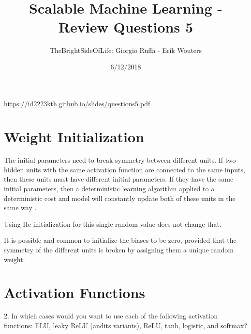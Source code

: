 \documentclass[a4paper]{article}
\title{Scalable Machine Learning - Review Questions 5}
\author{TheBrightSideOfLife: Giorgio Ruffa - Erik Wouters}
\date{6/12/2018}
\begin{document}
\maketitle

\url{https://id2223kth.github.io/slides/questions5.pdf}

\section{Weight Initialization}
The initial parameters need to break symmetry between different units. If two hidden units with the same activation function are connected to the same inputs, then these units must have different initial parameters. If they have the same initial parameters, then a deterministic learning algorithm applied to a deterministic cost and model will constantly update both of these units in the same way \cite[p.~301]{Goodfellow-et-al-2016}.

Using He initialization for this single random value does not change that.

It is possible and common to initialize the biases to be zero, provided that the symmetry of the different units is broken by assigning them a unique random weight.

\section{Activation Functions}
2. In which cases would you want to use each of the following activation functions: ELU, leaky ReLU (andits variants), ReLU, tanh, logistic, and softmax?
\end{document}
